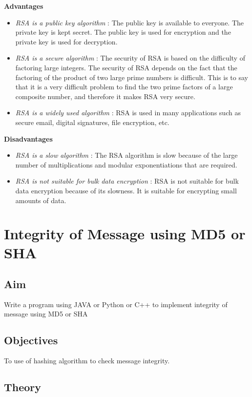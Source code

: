\documentclass[openany]{book}
\begin{document}
\begin{enumerate}
	      \textbf{Advantages}
	      \begin{itemize}
		      \item \textit{RSA is a public key algorithm} : The public key is available to everyone. The private key is kept secret. The public key is used for encryption and the private key is used for decryption.
		      \item \textit{RSA is a secure algorithm} : The security of RSA is based on the difficulty of factoring large integers. The security of RSA depends on the fact that the factoring of the product of two large prime numbers is difficult. This is to say that it is a very difficult problem to find the two prime factors of a large composite number, and therefore it makes RSA very secure.
		      \item \textit{RSA is a widely used algorithm} : RSA is used in many applications such as secure email, digital signatures, file encryption, etc.
	      \end{itemize}
	      \textbf{Disadvantages}
	      \begin{itemize}
		      \item \textit{RSA is a slow algorithm} : The RSA algorithm is slow because of the large number of multiplications and modular exponentiations that are required.
		      \item \textit{RSA is not suitable for bulk data encryption} : RSA is not suitable for bulk data encryption because of its slowness. It is suitable for encrypting small amounts of data.
	      \end{itemize}
\end{enumerate}



\chapter{Integrity of Message using MD5 or SHA}
\section{Aim}
Write a program using JAVA or Python or C++ to implement integrity of message using
MD5 or SHA

\section{Objectives}
To use of hashing algorithm to check message integrity.

\section{Theory}
\end{document}
